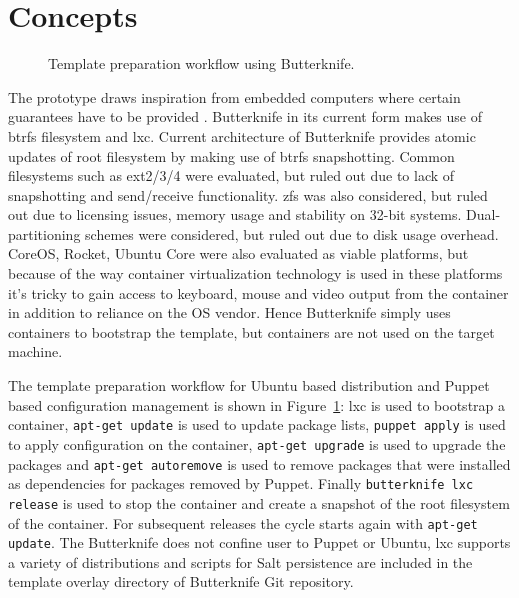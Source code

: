 \documentclass[a4paper,11pt]{kth-mag}
\begin{document}
\section{Concepts}
\label{sec:concepts}

\begin{figure}[!htb]
\centering
\scalebox{0.6}{}
\caption{Template preparation workflow using Butterknife.}
\label{fig:template-preparation-workflow}
\end{figure}


The prototype draws inspiration from embedded computers
where certain guarantees have to be provided
\cite{software-update-scheme-by-airwaves}.
Butterknife in its current form makes use of \acrshort{btrfs}
filesystem and \acrshort{lxc}.
Current architecture of Butterknife provides
atomic updates of root filesystem by making
use of \acrshort{btrfs} snapshotting.
Common filesystems such as ext2/3/4 were evaluated, but
ruled out due to lack of snapshotting and send/receive functionality.
\acrshort{zfs} was also considered, but ruled out due to
licensing issues, memory usage and stability on 32-bit systems.
Dual-partitioning schemes were considered, but ruled out due to
disk usage overhead.
CoreOS, Rocket, Ubuntu Core were also evaluated as viable
platforms, but because of the way container virtualization
technology is used in these platforms it's tricky
to gain access to keyboard, mouse and video output
from the container in addition to reliance on the OS vendor.
Hence Butterknife simply uses containers to bootstrap the
template, but containers are not used on the target machine.

The template preparation workflow for
Ubuntu based distribution and Puppet based configuration
management is shown in
Figure~\ref{fig:template-preparation-workflow}:
\acrshort{lxc} is used to bootstrap a container,
\lstinline!apt-get update! is used to update package lists,
\lstinline!puppet apply! is used to apply configuration on the container,
\lstinline!apt-get upgrade! is used to upgrade the packages and
\lstinline!apt-get autoremove! is used to remove packages that
were installed as dependencies
for packages removed by Puppet.
Finally \lstinline!butterknife lxc release! is used to stop
the container and create a snapshot of the root filesystem of the container.
For subsequent releases the cycle starts again with \lstinline!apt-get update!.
The Butterknife does not confine user to Puppet or Ubuntu,
\acrshort{lxc} supports a variety of distributions and scripts for
Salt persistence are included in the template overlay
directory of Butterknife Git repository.
\end{document}
